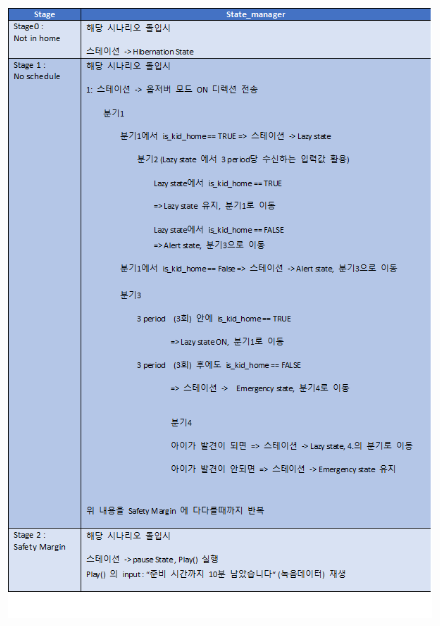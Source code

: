 \documentclass[conference]{IEEEtran}
\begin{document}
\begin{enumerate}[label=\arabic*.]
\begin{enumerate}[label=\arabic*.]
\begin{enumerate}[label=\alph*.]
        \begin{figure}[H]\centering\includegraphics[scale=0.35]{images/rule1.png}\end{figure}

\end{enumerate}
\end{enumerate}
\end{enumerate}
\end{document}
